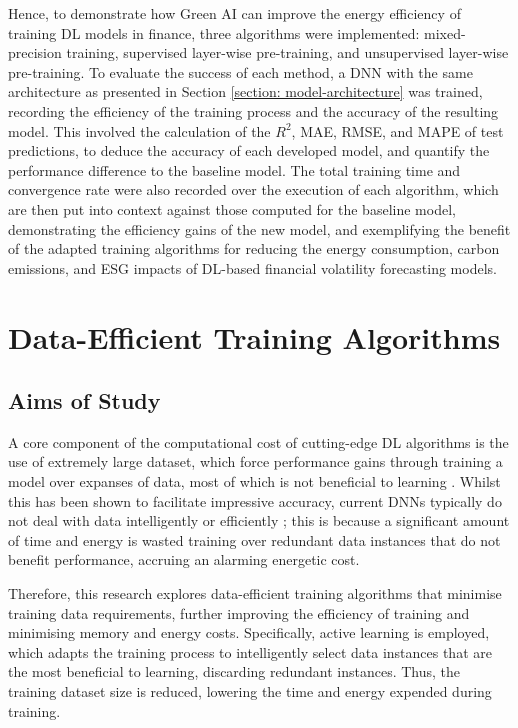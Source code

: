 \documentclass[a4paper, 11pt]{report}
\begin{document}
    Hence, to demonstrate how Green AI can improve the energy efficiency of training DL models in finance, three algorithms were implemented: mixed-precision training, supervised layer-wise pre-training, and unsupervised layer-wise pre-training. To evaluate the success of each method, a DNN with the same architecture as presented in Section \ref{section: model-architecture} was trained, recording the efficiency of the training process and the accuracy of the resulting model. This involved the calculation of the $R^2$, MAE, RMSE, and MAPE of test predictions, to deduce the accuracy of each developed model, and quantify the performance difference to the baseline model. The total training time and convergence rate were also recorded over the execution of each algorithm, which are then put into context against those computed for the baseline model, demonstrating the efficiency gains of the new model, and exemplifying the benefit of the adapted training algorithms for reducing the energy consumption, carbon emissions, and ESG impacts of DL-based financial volatility forecasting models.


    \chapter{Data-Efficient Training Algorithms}
    \label{chapter: data-extensions}

    \section{Aims of Study}

    A core component of the computational cost of cutting-edge DL algorithms is the use of extremely large dataset, which force performance gains through training a model over expanses of data, most of which is not beneficial to learning \citep{bender-2021}. Whilst this has been shown to facilitate impressive accuracy, current DNNs typically do not deal with data intelligently or efficiently \citep{aljarrah-2015}; this is because a significant amount of time and energy is wasted training over redundant data instances that do not benefit performance, accruing an alarming energetic cost.

    Therefore, this research explores data-efficient training algorithms that minimise training data requirements, further improving the efficiency of training and minimising memory and energy costs. Specifically, active learning is employed, which adapts the training process to intelligently select data instances that are the most beneficial to learning, discarding redundant instances. Thus, the training dataset size is reduced, lowering the time and energy expended during training. 
\end{document}
